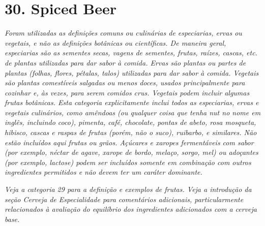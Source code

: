 \section*{30. Spiced Beer}
\textit{Foram utilizadas as definições comuns ou culinárias de especiarias, ervas ou vegetais, e não as definições botânicas ou científicas. De maneira geral, especiarias são as sementes secas, vagens de sementes, frutas, raízes, cascas, etc. de plantas utilizadas para dar sabor à comida. Ervas são plantas ou partes de plantas (folhas, flores, pétalas, talos) utilizadas para dar sabor à comida. Vegetais são plantas comestíveis salgadas ou menos doces, usados principalmente para cozinhar e, às vezes, para serem comidos crus. Vegetais podem incluir algumas frutas botânicas. Esta categoria explicitamente inclui todos as especiarias, ervas e vegetais culinários, como amêndoas (ou qualquer coisa que tenha nut no nome em inglês, incluindo coco), pimenta, café, chocolate, pontas de abeto, rosa mosqueta, hibisco, cascas e raspas de frutas (porém, não o suco), ruibarbo, e similares. Não estão incluídos aqui frutas ou grãos. Açúcares e xaropes fermentáveis com sabor (por exemplo, néctar de agave, xarope de bordo, melaço, sorgo, mel) ou adoçantes (por exemplo, lactose) podem ser incluídos somente em combinação com outros ingredientes permitidos e não devem ter um caráter dominante.}

\textit{Veja a categoria 29 para a definição e exemplos de frutas. Veja a introdução da seção Cerveja de Especialidade para comentários adicionais, particularmente relacionados à avaliação do equilíbrio dos ingredientes adicionados com a cerveja base.}
